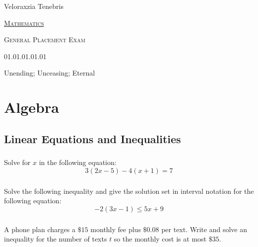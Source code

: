 \documentclass[12pt]{article}
\begin{document}
\begin{titlepage}
\begin{center}
			\begin{small}
				Veloraxzia Tenebris
			\end{small}

			\vspace{\fill}

			\begin{Huge}
				\textsc{\underline{Mathematics}}
			\end{Huge}

			\bigskip

			\bigskip

			\begin{LARGE}
				\textsc{General Placement Exam}
			\end{LARGE}

			\bigskip

			01.01.01.01.01

			\bigskip

			Unending; Unceasing; Eternal

			\vspace{\fill}
		\end{center}
	\end{titlepage}

	\pagestyle{tocfancy}
	\tableofcontents
	\clearpage

	\setcounter{page}{0}
	\pagestyle{velfancy}

	\section{Algebra}
		\subsection{Linear Equations and Inequalities}
			\subsubsection{}
				Solve for \(x\) in the following equation:
				\[3(2x-5)-4(x+1)=7\]
			\subsubsection{}
				Solve the following inequality and give the solution set in interval notation for the following equation:
				\[-2(3x-1)\le5x+9\]
			\subsubsection{}
				A phone plan charges a \(\$15\) monthly fee plus \(\$0.08\) per text. Write and solve an inequality for the number of texts \(t\) so the monthly cost is at most \(\$35\).
\end{document}
